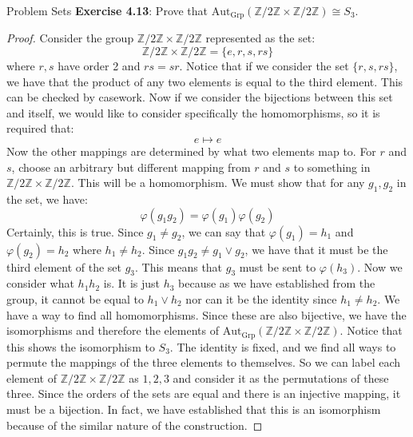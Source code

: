 \documentclass{report}
\begin{document}
\begin{exercises}{Problem Sets}
    \textbf{Exercise 4.13}: Prove that $\text{Aut}_{\text{Grp}}(\mathbb{Z}/2\mathbb{Z} \times \mathbb{Z}/2\mathbb{Z}) \cong S_{3}$.
        \begin{proof}
            Consider the group $\mathbb{Z}/2\mathbb{Z} \times \mathbb{Z}/2\mathbb{Z}$ represented as the set:
                \begin{equation*}
                    \mathbb{Z}/2\mathbb{Z} \times \mathbb{Z}/2\mathbb{Z} = \{e, r, s, rs\}
                \end{equation*}
            where $r, s$ have order 2 and $rs = sr$. Notice that if we consider the set $\{r, s, rs\}$, we have that the product of any two elements is equal to the third element. This can be checked by casework. Now if we consider the bijections between this set and itself, we would like to consider specifically the homomorphisms, so it is required that:
                \begin{equation*}
                    e \mapsto e
                \end{equation*}
            Now the other mappings are determined by what two elements map to. For $r$ and $s$, choose an arbitrary but different mapping from $r$ and $s$ to something in $\mathbb{Z}/2\mathbb{Z} \times \mathbb{Z}/2\mathbb{Z}$. This will be a homomorphism. We must show that for any $g_{1}, g_{2}$ in the set, we have:
                \begin{equation*}
                    \varphi(g_{1}g_{2}) = \varphi(g_{1})\varphi(g_{2})
                \end{equation*}
            Certainly, this is true. Since $g_{1} \neq g_{2}$, we can say that $\varphi(g_{1}) = h_{1}$ and $\varphi(g_{2}) = h_{2}$ where $h_{1} \neq h_{2}$. Since $g_{1}g_{2} \neq g_{1} \lor g_{2}$, we have that it must be the third element of the set $g_{3}$. This means that $g_{3}$ must be sent to $\varphi(h_{3})$. Now we consider what $h_{1}h_{2}$ is. It is just $h_{3}$ because as we have established from the group, it cannot be equal to $h_{1} \lor h_{2}$ nor can it be the identity since $h_{1} \neq h_{2}$. We have a way to find all homomorphisms. Since these are also bijective, we have the isomorphisms and therefore the elements of $\text{Aut}_{\text{Grp}}(\mathbb{Z}/2\mathbb{Z} \times \mathbb{Z}/2\mathbb{Z})$. Notice that this shows the isomorphism to $S_{3}$. The identity is fixed, and we find all ways to permute the mappings of the three elements to themselves. So we can label each element of $\mathbb{Z}/2\mathbb{Z} \times \mathbb{Z}/2\mathbb{Z}$ as $1, 2, 3$ and consider it as the permutations of these three. Since the orders of the sets are equal and there is an injective mapping, it must be a bijection. In fact, we have established that this is an isomorphism because of the similar nature of the construction.
        \end{proof}


\end{exercises}
\end{document}

